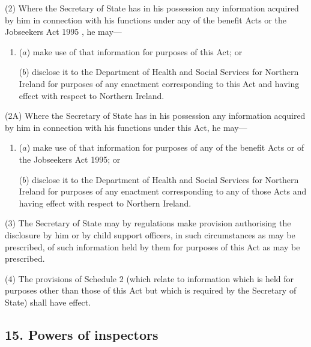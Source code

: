 \documentclass[12pt,a4paper]{article}
\begin{document}
(2) Where the Secretary of State has in his possession any information acquired by him in connection with his functions under any of the benefit Acts
or the Jobseekers Act 1995%
, he may—
\begin{enumerate}\item[]
($a$) make use of that information for purposes of this Act; or

($b$) disclose it to the Department of Health and Social Services for Northern Ireland for purposes of any enactment corresponding to this Act and having effect with respect to Northern Ireland.
\end{enumerate}

(2A) Where the Secretary of State has in his possession any information acquired by him in connection with his functions under this Act, he may—
\begin{enumerate}\item[]
($a$) make use of that information for purposes of any of the benefit Acts or of the Jobseekers Act 1995; or

($b$) disclose it to the Department of Health and Social Services for Northern Ireland for purposes of any enactment corresponding to any of those Acts and having effect with respect to Northern Ireland.
\end{enumerate}

(3) The Secretary of State may by regulations make provision authorising the disclosure by him or by child support officers, in such circumstances as may be prescribed, of such information held by them for purposes of this Act as may be prescribed.

(4) The provisions of Schedule 2 (which relate to information which is held for purposes other than those of this Act but which is required by the Secretary of State) shall have effect.


\subsection{15. Powers of inspectors}
\end{document}
